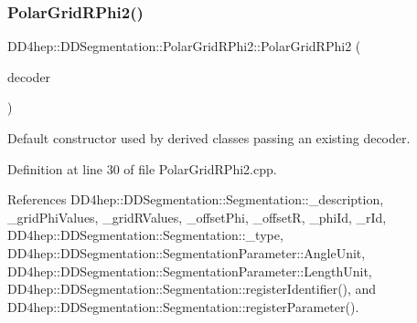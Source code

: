 \hypertarget{class_d_d4hep_1_1_d_d_segmentation_1_1_polar_grid_r_phi2_ad79eed46ad54d3caf96ef51b8fd29ea7}{}\label{class_d_d4hep_1_1_d_d_segmentation_1_1_polar_grid_r_phi2_ad79eed46ad54d3caf96ef51b8fd29ea7} 
\subsubsection{\texorpdfstring{Polar\+Grid\+R\+Phi2()}{PolarGridRPhi2()}\hspace{0.1cm}{\footnotesize\ttfamily [2/2]}}
{\footnotesize\ttfamily D\+D4hep\+::\+D\+D\+Segmentation\+::\+Polar\+Grid\+R\+Phi2\+::\+Polar\+Grid\+R\+Phi2 (\begin{DoxyParamCaption}\item[{\hyperlink{class_d_d4hep_1_1_d_d_segmentation_1_1_bit_field64}{Bit\+Field64} $\ast$}]{decoder }\end{DoxyParamCaption})}



Default constructor used by derived classes passing an existing decoder. 



Definition at line 30 of file Polar\+Grid\+R\+Phi2.\+cpp.



References D\+D4hep\+::\+D\+D\+Segmentation\+::\+Segmentation\+::\+\_\+description, \+\_\+grid\+Phi\+Values, \+\_\+grid\+R\+Values, \+\_\+offset\+Phi, \+\_\+offsetR, \+\_\+phi\+Id, \+\_\+r\+Id, D\+D4hep\+::\+D\+D\+Segmentation\+::\+Segmentation\+::\+\_\+type, D\+D4hep\+::\+D\+D\+Segmentation\+::\+Segmentation\+Parameter\+::\+Angle\+Unit, D\+D4hep\+::\+D\+D\+Segmentation\+::\+Segmentation\+Parameter\+::\+Length\+Unit, D\+D4hep\+::\+D\+D\+Segmentation\+::\+Segmentation\+::register\+Identifier(), and D\+D4hep\+::\+D\+D\+Segmentation\+::\+Segmentation\+::register\+Parameter().

\hypertarget{class_d_d4hep_1_1_d_d_segmentation_1_1_polar_grid_r_phi2_a63dc7071aea7a6fbcb5a01b35bdad59e}{}\label{class_d_d4hep_1_1_d_d_segmentation_1_1_polar_grid_r_phi2_a63dc7071aea7a6fbcb5a01b35bdad59e} 
